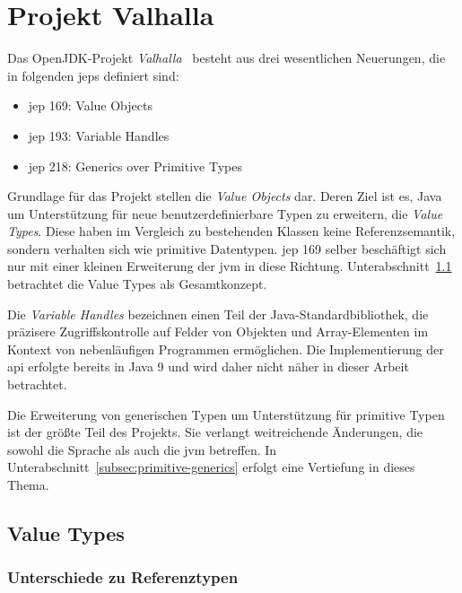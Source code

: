 \section{Projekt Valhalla}\label{sec:valhalla}

Das OpenJDK-Projekt \emph{Valhalla}~\cite{openjdk-valhalla} besteht aus drei wesentlichen Neuerungen, die in folgenden \acp{jep} definiert sind:

\begin{itemize}
    \itemsep0em
    \item \ac{jep} 169: Value Objects~\cite{jep-169}
    \item \ac{jep} 193: Variable Handles~\cite{jep-193}
    \item \ac{jep} 218: Generics over Primitive Types~\cite{jep-218}
\end{itemize}

Grundlage für das Projekt stellen die \emph{Value Objects} dar.
Deren Ziel ist es, Java um Unterstützung für neue benutzerdefinierbare Typen zu erweitern, die \emph{Value Types}.
Diese haben im Vergleich zu bestehenden Klassen keine Referenzsemantik, sondern verhalten sich wie primitive Datentypen.
\ac{jep} 169 selber beschäftigt sich nur mit einer kleinen Erweiterung der \ac{jvm} in diese Richtung.
Unterabschnitt~\ref{subsec:value-types} betrachtet die Value Types als Gesamtkonzept.

Die \emph{Variable Handles} bezeichnen einen Teil der Java-Standardbibliothek, die präzisere Zugriffskontrolle auf Felder von Objekten und Array-Elementen im Kontext von nebenläufigen Programmen ermöglichen.
Die Implementierung der \ac{api} erfolgte bereits in Java 9 und wird daher nicht näher in dieser Arbeit betrachtet.

Die Erweiterung von generischen Typen um Unterstützung für primitive Typen ist der größte Teil des Projekts.
Sie verlangt weitreichende Änderungen, die sowohl die Sprache als auch die \ac{jvm} betreffen.
In Unterabschnitt~\ref{subsec:primitive-generics} erfolgt eine Vertiefung in dieses Thema.

\subsection{Value Types}\label{subsec:value-types}


\subsubsection{Unterschiede zu Referenztypen}

